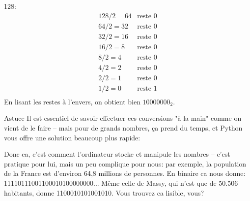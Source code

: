\documentclass[12pt]{article}
\begin{document}
\begin{MaReponse}
\begin{alphenum}
			\item 128:
				\[
				\begin{array}{ll}
					128/ 2 = 64 & \text{reste } 0 \\
					64 / 2 = 32 & \text{reste } 0 \\
					32 / 2 = 16 & \text{reste } 0 \\
					16 / 2 = 8 & \text{reste } 0 \\
					8 / 2 = 4 & \text{reste } 0 \\
					4 / 2 = 2 & \text{reste } 0 \\
					2 / 2 = 1 & \text{reste } 0 \\
					1 / 2 = 0 & \text{reste } 1 \\
				\end{array}
				\]
				En lisant les restes à l'envers, on obtient bien \(10000000_{2}\).
				
		\end{alphenum}
	\end{MaReponse}
	
	\begin{MonAmp}{Astuce}
		Il est essentiel de savoir effectuer ces conversions "à la main" comme on vient de le faire -- mais pour de grands nombres, ça prend du temps, et Python vous offre une solution beaucoup plus rapide:
	\end{MonAmp}
	
	Donc ca, c'est comment l'ordinateur stocke et manipule les nombres -- c'est pratique pour lui, mais un peu complique pour nous: par exemple, la population de la France est d'environ 64,8 millions de personnes. En binaire ca nous donne: 11110111001100010100000000... Même celle de Massy, qui n'est que de 50.506 habitants, donne 1100010101001010. Vous trouvez ca lisible, vous?
	
\end{document}
